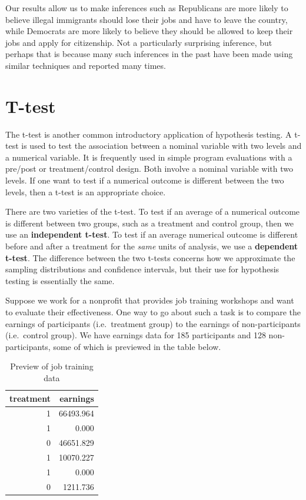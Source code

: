 \documentclass[
]{book}
\begin{document}
Our results allow us to make inferences such as Republicans are more likely to believe illegal immigrants should lose their jobs and have to leave the country, while Democrats are more likely to believe they should be allowed to keep their jobs and apply for citizenship. Not a particularly surprising inference, but perhaps that is because many such inferences in the past have been made using similar techniques and reported many times.

\hypertarget{t-test}{%
\section{T-test}\label{t-test}}

The t-test is another common introductory application of hypothesis testing. A t-test is used to test the association between a nominal variable with two levels and a numerical variable. It is frequently used in simple program evaluations with a pre/post or treatment/control design. Both involve a nominal variable with two levels. If one want to test if a numerical outcome is different between the two levels, then a t-test is an appropriate choice.

There are two varieties of the t-test. To test if an average of a numerical outcome is different between two groups, such as a treatment and control group, then we use an \textbf{independent t-test}. To test if an average numerical outcome is different before and after a treatment for the \emph{same} units of analysis, we use a \textbf{dependent t-test}. The difference between the two t-tests concerns how we approximate the sampling distributions and confidence intervals, but their use for hypothesis testing is essentially the same.

Suppose we work for a nonprofit that provides job training workshops and want to evaluate their effectiveness. One way to go about such a task is to compare the earnings of participants (i.e.~treatment group) to the earnings of non-participants (i.e.~control group). We have earnings data for 185 participants and 128 non-participants, some of which is previewed in the table below.

\begin{table}

\caption{\label{tab:jobtraindata}Preview of job training data}
\centering
\begin{tabular}[t]{r|r}
\hline
treatment & earnings\\
\hline
1 & 66493.964\\
\hline
1 & 0.000\\
\hline
0 & 46651.829\\
\hline
1 & 10070.227\\
\hline
1 & 0.000\\
\hline
0 & 1211.736\\
\hline
\end{tabular}
\end{table}
\end{document}
